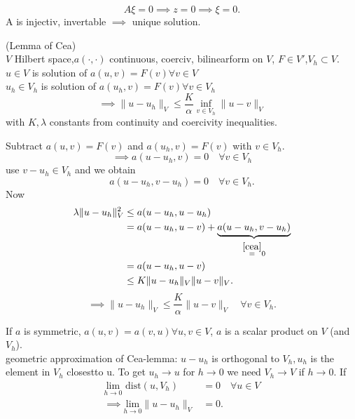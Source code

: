 \begin{equation*}
	A\xi = 0 \implies z=0 \implies \xi = 0.
\end{equation*}
A is injectiv, invertable $\implies$ unique solution.
\begin{lemma_}
	(Lemma of Cea)\\
	$V$ Hilbert space,$a(\cdot,\cdot)$ continuous, coerciv, bilinearform on $V$, $F \in V'$,$V_h \subset V$.\\
	$u\in V$ is solution of $a(u,v) = F(v) \forall v\in V$\\
	$u_h\in V_h$ is solution of $a(u_h,v) = F(v) \forall v\in V_h$\\
	\begin{equation*}
		\implies \|u-u_h\|_V \leq \frac{K}{\alpha}\underset{v \in V_h}{\inf}\|u-v\|_V
	\end{equation*} 
	with $K,\lambda$ constants from continuity and coercivity inequalities.
\end{lemma_}
\begin{proof_}
	Subtract $a(u,v) = F(v)$ and $a(u_h,v) = F(v)$ with $v \in V_h$.
	\begin{equation*}
		\implies a(u-u_h,v)=0\quad \forall v\in V_h
	\end{equation*}
	use $v-u_h \in V_h$ and we obtain
	\begin{equation}\label{cea}
		a(u-u_h,v-u_h)=0\quad \forall v\in V_h.
	\end{equation}
	Now
	\begin{align*}
		\lambda \|u-u_h\|^2_V &\leq a(u-u_h,u-u_h)\\
		&= a(u-u_h,u-v) + \underbrace{a(u-u_h,v-u_h)}_{\overset{\ref{cea}}{=}0}\\
		&= a(u-u_h,u-v)\\
		&\leq K\|u-u_h\|_V\|u-v\|_V.
	\end{align*}
	\begin{equation*}
		\implies \|u-u_h\|_V \leq \frac{K}{\alpha}\|u-v\|_V \quad \forall v\in V_h.
	\end{equation*}
\end{proof_}
If $a$ is symmetric, $a(u,v) = a(v,u) \forall u,v \in V$, $a$ is a scalar product on $V$ (and $V_h$).\\
geometric approximation of Cea-lemma: $u-u_h$ is orthogonal to $V_h,u_h$ is the element in $V_h$ \glqq closest\grqq to u. To get $u_h \to u$ for $h \to 0$ we need $V_h \to V$ if $h\to 0$. If 
\begin{align*}
	\underset{h\to 0}{\text{lim}} \text{ dist}(u,V_h) &= 0 \quad \forall u \in V\\
	\implies \underset{h\to 0}{\text{lim}}\|u-u_h\|_V &=0.
\end{align*}
